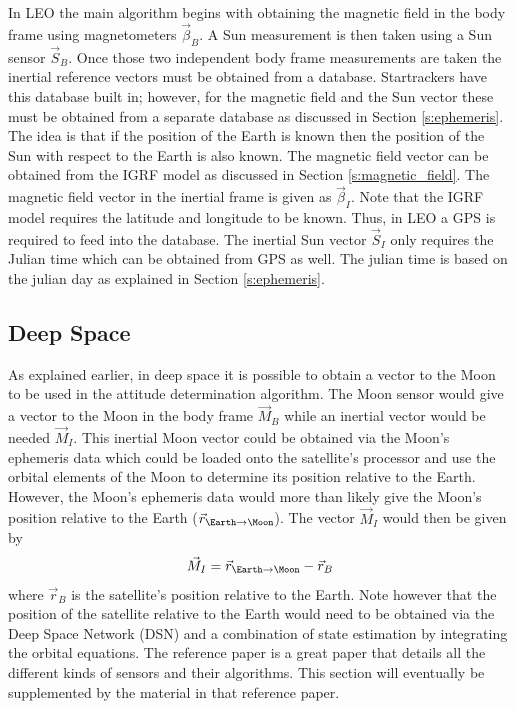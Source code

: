 \documentclass{article}
\begin{document}
In LEO the main algorithm begins with obtaining the magnetic field in
the body frame using magnetometers $\vec{\beta}_B$. A Sun measurement is
then taken using a Sun sensor $\vec{S}_B$. Once those two independent
body frame measurements are taken the inertial reference vectors must
be obtained from a database. Startrackers have this database built in;
however, for the magnetic field and the Sun vector these must be
obtained from a separate database as discussed in Section
\ref{s:ephemeris}. The idea is that if the position of the Earth is
known then the position of the Sun with respect to the Earth is also
known. The magnetic field vector can be 
obtained from the IGRF model as discussed in Section
\ref{s:magnetic_field}. The magnetic field vector in the inertial
frame is given as $\vec{\beta}_I$. Note that the IGRF model requires
the latitude and longitude to be known. Thus, in LEO a GPS is required
to feed into the database. The inertial Sun vector $\vec{S}_I$ only
requires the Julian time which can be obtained from GPS as well. The julian time is
based on the julian day as explained in Section \ref{s:ephemeris}. 

\subsection{Deep Space}

As explained earlier, in deep space it is possible to obtain a vector
to the Moon to be used in the attitude determination algorithm. The
Moon sensor would give a vector to the Moon in the body frame
$\vec{M}_B$ while an inertial vector would be needed $\vec{M}_I$. This
inertial Moon vector could be obtained via the Moon's
ephemeris data which could be loaded onto the satellite's processor
and use the orbital elements of the Moon to determine its position
relative to the Earth. However, the Moon's ephemeris data would more
than likely give the Moon's position relative to the Earth
($\vec{r}_{\Earth \rightarrow \Moon}$). The vector $\vec{M}_I$ would
then be given by
\begin{equation}
  \vec{M}_I = \vec{r}_{\Earth \rightarrow \Moon} - \vec{r}_{B}
\end{equation}
where $\vec{r}_B$ is the satellite's position relative to the
Earth. Note however that the position of the satellite relative to the
Earth would need to be obtained via the Deep Space Network (DSN) and a
combination of state estimation by integrating the orbital
equations. The reference paper \cite{Munoz} is a great paper that
details all the different kinds of sensors and their algorithms. This
section will eventually be supplemented by the material in that
reference paper.
\end{document}
